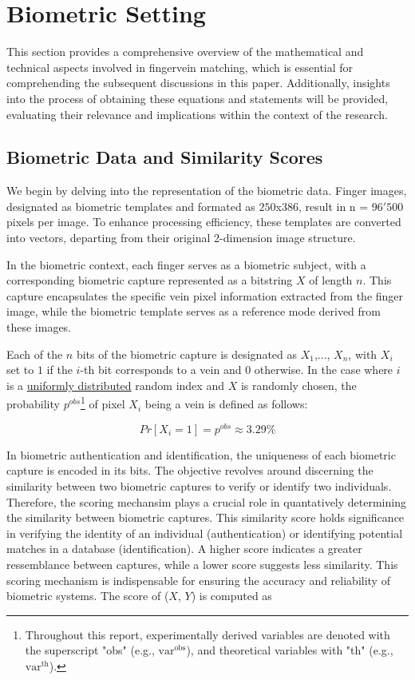 
\section{Biometric Setting}
This section provides a comprehensive overview of the mathematical and technical aspects involved in fingervein matching, which is essential for comprehending the subsequent discussions in this paper. Additionally, insights into the process of obtaining these equations and statements will be provided, evaluating their relevance and implications within the context of the research. 

\subsection{Biometric Data and Similarity Scores}
\label{Bio_data_sim_scores}
We begin by delving into the representation of the biometric data. Finger images, designated as biometric templates and formated as \(250\)x\(386\), result in n = \(96'500\) pixels per image. To enhance processing efficiency, these templates are converted into vectors, departing from their original 2-dimension image structure. 

In the biometric context, each finger serves as a biometric subject, with a corresponding biometric capture represented as a bitstring \(X\) of length \(n\). This capture encapsulates the specific vein pixel information extracted from the finger image, while the biometric template serves as a reference mode derived from these images. 

Each of the \(n\) bits of the biometric capture is designated as \(X_1\),..., \(X_n\), with \(X_i\) set to \(1\) if the \(i\)-th bit corresponds to a vein and \(0\) otherwise. In the case where \(i\) is a \hyperref[def:Uniform Distribution]{uniformly distributed} random index and \(X\) is randomly chosen, the probability \(p^{obs}\)\footnote{Throughout this report, experimentally derived variables are denoted with the superscript "obs" (e.g., \( \text{var}^{\text{obs}} \)), and theoretical variables with "th" (e.g., \( \text{var}^{\text{th}} \)).} of pixel \(X_i\) being a vein is defined as follows:

\begin{equation} \label{eq:proba}
    Pr[X_i = 1] = p^{obs} \approx 3.29 \% 
\end{equation}

In biometric authentication and identification, the uniqueness of each biometric capture is encoded in its bits. The objective revolves around discerning the similarity between two biometric captures to verify or identify two individuals. Therefore, the scoring mechansim plays a crucial role in quantatively determining the similarity between biometric captures. This similarity score holds significance in verifying the identity of an individual (authentication) or identifying potential matches in a database (identification). A higher score indicates a greater ressemblance between captures, while a lower score suggests less similarity. This scoring mechanism is indispensable for ensuring the accuracy and reliability of biometric systems. The score of (\(X\), \(Y\)) is computed as

